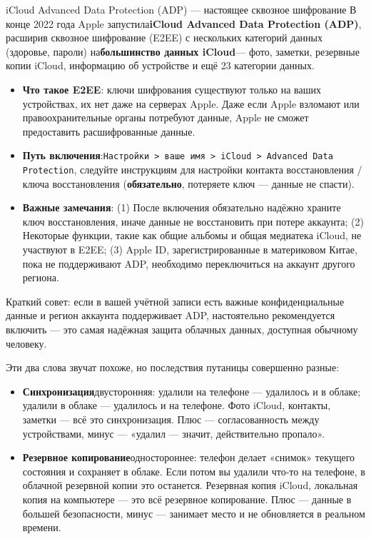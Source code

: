 \begin{tcbwarn}{iCloud Advanced Data Protection (ADP) — настоящее сквозное шифрование}
В конце 2022 года Apple запустила\textbf{iCloud Advanced Data Protection (ADP)}, расширив сквозное шифрование (E2EE) с нескольких категорий данных (здоровье, пароли) на\textbf{большинство данных iCloud}— фото, заметки, резервные копии iCloud, информацию об устройстве и ещё 23 категории данных.

\begin{itemize}
  \item \textbf{Что такое E2EE}: ключи шифрования существуют только на ваших устройствах, их нет даже на серверах Apple. Даже если Apple взломают или правоохранительные органы потребуют данные, Apple не сможет предоставить расшифрованные данные.
  \item \textbf{Путь включения}:\texttt{Настройки > ваше имя > iCloud > Advanced Data Protection}, следуйте инструкциям для настройки контакта восстановления / ключа восстановления (\textbf{обязательно}, потеряете ключ — данные не спасти).
  \item \textbf{Важные замечания}: (1) После включения обязательно надёжно храните ключ восстановления, иначе данные не восстановить при потере аккаунта; (2) Некоторые функции, такие как общие альбомы и общая медиатека iCloud, не участвуют в E2EE; (3) Apple ID, зарегистрированные в материковом Китае, пока не поддерживают ADP, необходимо переключиться на аккаунт другого региона.
\end{itemize}

Краткий совет: если в вашей учётной записи есть важные конфиденциальные данные и регион аккаунта поддерживает ADP, настоятельно рекомендуется включить — это самая надёжная защита облачных данных, доступная обычному человеку.

\end{tcbwarn}


Эти два слова звучат похоже, но последствия путаницы совершенно разные:

\begin{itemize}
  \item \textbf{Синхронизация}двусторонняя: удалили на телефоне — удалилось и в облаке; удалили в облаке — удалилось и на телефоне. Фото iCloud, контакты, заметки — всё это синхронизация. Плюс — согласованность между устройствами, минус — «удалил — значит, действительно пропало».
  \item \textbf{Резервное копирование}одностороннее: телефон делает «снимок» текущего состояния и сохраняет в облаке. Если потом вы удалили что-то на телефоне, в облачной резервной копии это останется. Резервная копия iCloud, локальная копия на компьютере — это всё резервное копирование. Плюс — данные в большей безопасности, минус — занимает место и не обновляется в реальном времени.
\end{itemize}

